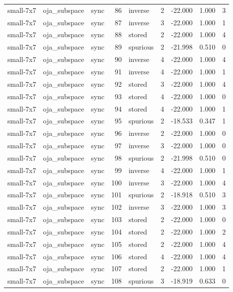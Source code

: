 \begin{tabular}{lllrlrrrr}
small-7x7 & oja\_subspace & sync & 86 & inverse & 2 & -22.000 & 1.000 & 3 \\
small-7x7 & oja\_subspace & sync & 87 & inverse & 3 & -22.000 & 1.000 & 1 \\
small-7x7 & oja\_subspace & sync & 88 & stored & 2 & -22.000 & 1.000 & 4 \\
small-7x7 & oja\_subspace & sync & 89 & spurious & 2 & -21.998 & 0.510 & 0 \\
small-7x7 & oja\_subspace & sync & 90 & inverse & 4 & -22.000 & 1.000 & 4 \\
small-7x7 & oja\_subspace & sync & 91 & inverse & 4 & -22.000 & 1.000 & 1 \\
small-7x7 & oja\_subspace & sync & 92 & stored & 3 & -22.000 & 1.000 & 4 \\
small-7x7 & oja\_subspace & sync & 93 & stored & 4 & -22.000 & 1.000 & 0 \\
small-7x7 & oja\_subspace & sync & 94 & stored & 4 & -22.000 & 1.000 & 1 \\
small-7x7 & oja\_subspace & sync & 95 & spurious & 2 & -18.533 & 0.347 & 1 \\
small-7x7 & oja\_subspace & sync & 96 & inverse & 2 & -22.000 & 1.000 & 0 \\
small-7x7 & oja\_subspace & sync & 97 & inverse & 3 & -22.000 & 1.000 & 0 \\
small-7x7 & oja\_subspace & sync & 98 & spurious & 2 & -21.998 & 0.510 & 0 \\
small-7x7 & oja\_subspace & sync & 99 & inverse & 4 & -22.000 & 1.000 & 1 \\
small-7x7 & oja\_subspace & sync & 100 & inverse & 3 & -22.000 & 1.000 & 4 \\
small-7x7 & oja\_subspace & sync & 101 & spurious & 2 & -18.918 & 0.510 & 3 \\
small-7x7 & oja\_subspace & sync & 102 & inverse & 3 & -22.000 & 1.000 & 3 \\
small-7x7 & oja\_subspace & sync & 103 & stored & 2 & -22.000 & 1.000 & 0 \\
small-7x7 & oja\_subspace & sync & 104 & stored & 2 & -22.000 & 1.000 & 2 \\
small-7x7 & oja\_subspace & sync & 105 & stored & 2 & -22.000 & 1.000 & 4 \\
small-7x7 & oja\_subspace & sync & 106 & stored & 4 & -22.000 & 1.000 & 4 \\
small-7x7 & oja\_subspace & sync & 107 & stored & 2 & -22.000 & 1.000 & 1 \\
small-7x7 & oja\_subspace & sync & 108 & spurious & 3 & -18.919 & 0.633 & 0 \\

\end{tabular}
